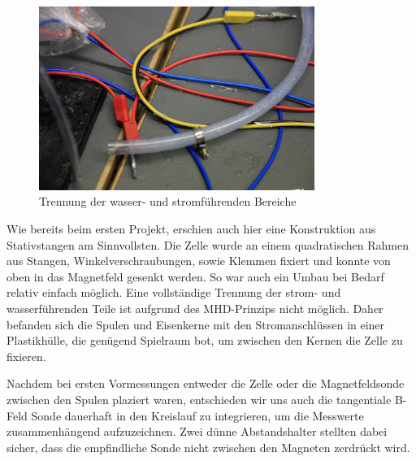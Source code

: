\documentclass[11pt]{scrartcl}
\begin{document}
\begin{figure}[ht]
\begin{center}
\includegraphics[width=0.8\textwidth]{images/wasser-strom1.jpg}
\end{center}
\vspace{-1.5\baselineskip}
\caption{Trennung der wasser- und stromf\"uhrenden Bereiche}
\label{wasser-strom1}
\end{figure}

Wie bereits beim ersten Projekt, erschien auch hier eine Konstruktion aus Stativstangen am Sinnvollsten. Die Zelle wurde an einem quadratischen Rahmen aus Stangen, Winkelverschraubungen, sowie Klemmen fixiert und konnte von oben in das Magnetfeld gesenkt werden. So war auch ein Umbau bei Bedarf relativ einfach m\"oglich. Eine vollst\"andige Trennung der strom- und wasserf\"uhrenden Teile ist aufgrund des MHD-Prinzips nicht m\"oglich. Daher befanden sich die Spulen und Eisenkerne mit den Stromanschl\"ussen in einer Plastikh\"ulle, die gen\"ugend Spielraum bot, um zwischen den Kernen die Zelle zu fixieren. 

Nachdem bei ersten Vormessungen entweder die Zelle oder die Magnetfeldsonde zwischen den  Spulen plaziert waren, entschieden wir uns auch die tangentiale B-Feld Sonde dauerhaft in den Kreislauf zu integrieren, um die Messwerte zusammenh\"angend aufzuzeichnen. Zwei d\"unne Abstandshalter stellten dabei sicher, dass die empfindliche Sonde nicht zwischen den Magneten zerdr\"uckt wird.
\end{document}
